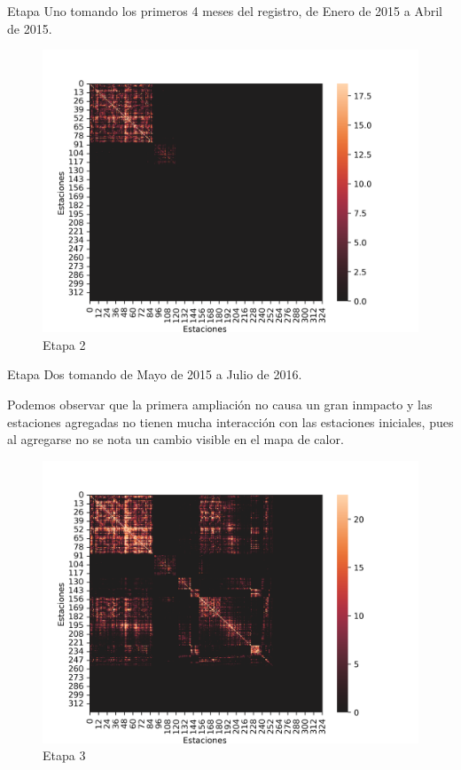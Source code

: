 \documentclass[
]{article}
\begin{document}
Etapa Uno tomando los primeros 4 meses del registro, de Enero de 2015 a
Abril de 2015.

\begin{figure}
\centering
\includegraphics{../plots/resultsDos.png}
\caption{Etapa 2}
\end{figure}

Etapa Dos tomando de Mayo de 2015 a Julio de 2016.

Podemos observar que la primera ampliación no causa un gran inmpacto y
las estaciones agregadas no tienen mucha interacción con las estaciones
iniciales, pues al agregarse no se nota un cambio visible en el mapa de
calor.

\begin{figure}
\centering
\includegraphics{../plots/resultsTres.png}
\caption{Etapa 3}
\end{figure}
\end{document}
